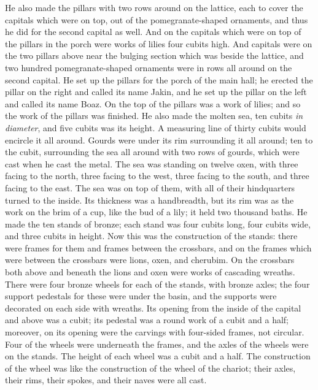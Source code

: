 \begin{biblechapter}
\verse He also made the pillars with two rows around on the lattice, each to cover the capitals which were on top, out of the pomegranate-shaped ornaments, and thus he did for the second capital as well.
\verse And on the capitals which were on top of the pillars in the porch were works of lilies four cubits high.
\verse And capitals were on the two pillars above near the bulging section which was beside the lattice, and two hundred pomegranate-shaped ornaments were in rows all around on the second capital.
\verse He set up the pillars for the porch of the main hall; he erected the pillar on the right and called its name Jakin, and he set up the pillar on the left and called its name Boaz.
\verse On the top of the pillars was a work of lilies; and so the work of the pillars was finished.
\verse He also made the molten sea, ten cubits \textit{in diameter}, and five cubits was its height. A measuring line of thirty cubits would encircle it all around.
\verse Gourds were under its rim surrounding it all around; ten to the cubit, surrounding the sea all around with two rows of gourds, which were cast when he cast the metal.
\verse The sea was standing on twelve oxen, with three facing to the north, three facing to the west, three facing to the south, and three facing to the east. The sea was on top of them, with all of their hindquarters turned to the inside.
\verse Its thickness was a handbreadth, but its rim was as the work on the brim of a cup, like the bud of a lily; it held two thousand baths.
\verse He made the ten stands of bronze; each stand was four cubits long, four cubits wide, and three cubits in height.
\verse Now this was the construction of the stands: there were frames for them and frames between the crossbars,
\verse and on the frames which were between the crossbars were lions, oxen, and cherubim. On the crossbars both above and beneath the lions and oxen were works of cascading wreaths.
\verse There were four bronze wheels for each of the stands, with bronze axles; the four support pedestals for these were under the basin, and the supports were decorated on each side with wreaths.
\verse Its opening from the inside of the capital and above was a cubit; its pedestal was a round work of a cubit and a half; moreover, on its opening were the carvings with four-sided frames, not circular.
\verse Four of the wheels were underneath the frames, and the axles of the wheels were on the stands. The height of each wheel was a cubit and a half.
\verse The construction of the wheel was like the construction of the wheel of the chariot; their axles, their rims, their spokes, and their naves were all cast.

\end{biblechapter}
